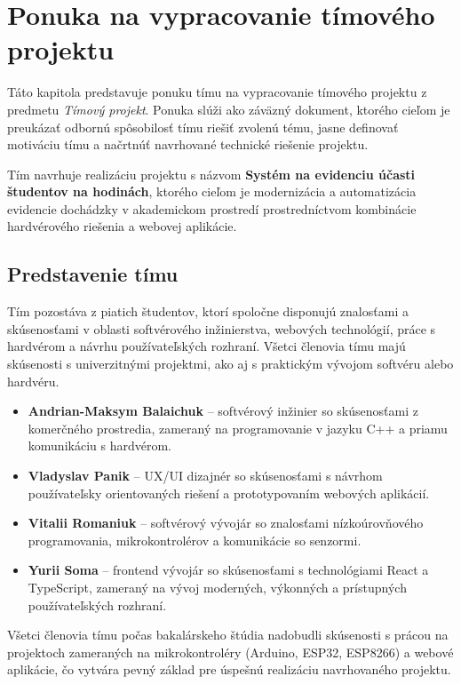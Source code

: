 \chapter{Ponuka na vypracovanie tímového projektu}

Táto kapitola predstavuje ponuku tímu na vypracovanie tímového projektu z predmetu
\textit{Tímový projekt}. Ponuka slúži ako záväzný dokument, ktorého cieľom je preukázať
odbornú spôsobilosť tímu riešiť zvolenú tému, jasne definovať motiváciu tímu a načrtnúť
navrhované technické riešenie projektu.

Tím navrhuje realizáciu projektu s názvom \textbf{Systém na evidenciu účasti študentov na hodinách},
ktorého cieľom je modernizácia a automatizácia evidencie dochádzky v akademickom prostredí
prostredníctvom kombinácie hardvérového riešenia a webovej aplikácie.

\section{Predstavenie tímu}

Tím pozostáva z piatich študentov, ktorí spoločne disponujú znalosťami a skúsenosťami
v oblasti softvérového inžinierstva, webových technológií, práce s hardvérom a návrhu
používateľských rozhraní. Všetci členovia tímu majú skúsenosti s univerzitnými projektmi,
ako aj s praktickým vývojom softvéru alebo hardvéru.

\begin{itemize}
    \item \textbf{Andrian-Maksym Balaichuk} – softvérový inžinier so skúsenosťami z komerčného prostredia,
    zameraný na programovanie v jazyku C++ a priamu komunikáciu s hardvérom.
    \item \textbf{Vladyslav Panik} – UX/UI dizajnér so skúsenosťami s návrhom používateľsky orientovaných
    riešení a prototypovaním webových aplikácií.
    \item \textbf{Vitalii Romaniuk} – softvérový vývojár so znalosťami nízkoúrovňového programovania,
    mikrokontrolérov a komunikácie so senzormi.
    \item \textbf{Yurii Soma} – frontend vývojár so skúsenosťami s technológiami React a TypeScript,
    zameraný na vývoj moderných, výkonných a prístupných používateľských rozhraní.
\end{itemize}

Všetci členovia tímu počas bakalárskeho štúdia nadobudli skúsenosti s prácou na projektoch
zameraných na mikrokontroléry (Arduino, ESP32, ESP8266) a webové aplikácie, čo vytvára
pevný základ pre úspešnú realizáciu navrhovaného projektu.

